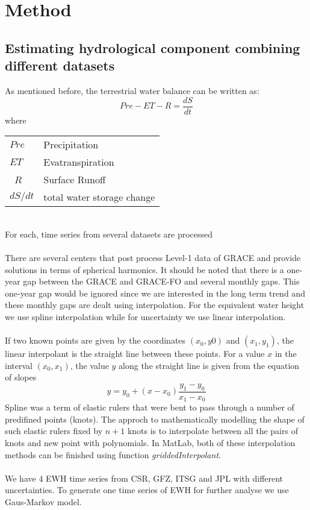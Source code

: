 \chapter{Method}
\section{Estimating hydrological component combining different datasets}\label{section:combine}
As mentioned before, the terrestrial water balance can be written as:
\begin{equation}
Pre - ET - R = \frac{dS}{dt}
\end{equation}
where
\begin{table}[htbp]
	\begin{tabular}{ll}
		$Pre$   & Precipitation    \\ 
		$ET$    & Evatranspiration \\ \
		$R$     & Surface Runoff \\ 
		$dS / dt$ & total water storage change \\ 
	\end{tabular}
\end{table}\\
For each, time series from several datasets are processed\\\\
There are several centers that post process Level-1 data of GRACE and provide solutions in terms of spherical harmonics. It should be noted that there is a one-year gap between the GRACE and GRACE-FO and several monthly gaps. This one-year gap would be ignored since we are interested in the long term trend and these monthly gaps are dealt using interpolation. For the equivalent water height we use spline interpolation while for uncertainty we use linear interpolation.\\\\
If two known points are given by the coordinates $(x_0,y0)$ and $(x_1,y_1)$, the linear interpolant is the straight line between these points. For a value $x$ in the interval $(x_0,x_1)$, the value $y$ along the straight line is given from the equation of slopes
\begin{equation}
	y = y_0 + (x-x_0)\frac{y_1-y_0}{x_1-x_0}
\end{equation}
Spline was a term of elastic rulers that were bent to pass through a number of predifined points (knots). The approch to mathematically modelling the shape of such elastic rulers fixed by $n+1$ knots is to interpolate between all the pairs of knots and new point with polynomials. In MatLab, both of these interpolation methods can be finished using function \textit{griddedInterpolant}.\\\\
We have 4 EWH time series from CSR, GFZ, ITSG and JPL with different uncertainties. To generate one time series of EWH for further analyse we use Gaus-Markov model.

